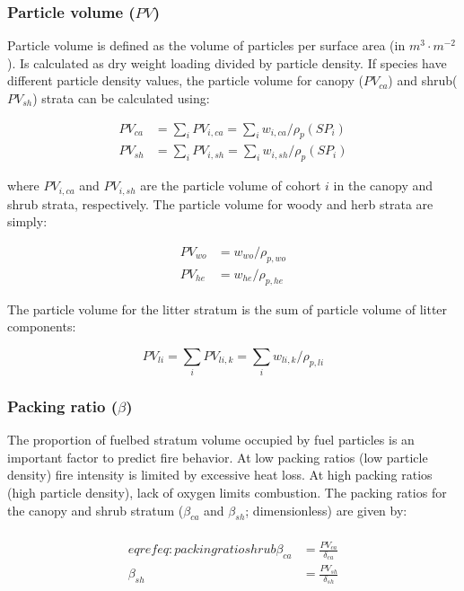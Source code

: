 \documentclass[]{book}
\begin{document}
\subsubsection{\texorpdfstring{Particle volume
(\(PV\))}{Particle volume (PV)}}\label{particle-volume-pv}

Particle volume is defined as the volume of particles per surface area
(in \(m^3\cdot m^{-2}\)). Is calculated as dry weight loading divided by
particle density. If species have different particle density values, the
particle volume for canopy (\(PV_{ca}\)) and shrub(\(PV_{sh}\)) strata
can be calculated using:

\begin{eqnarray}
PV_{ca} &= \sum_{i}{PV_{i,ca}} = \sum_{i}{w_{i,ca}/\rho_{p}(SP_i)}\\
PV_{sh} &= \sum_{i}{PV_{i,sh}} = \sum_{i}{w_{i,sh}/\rho_{p}(SP_i)}
\end{eqnarray}

where \(PV_{i,ca}\) and \(PV_{i,sh}\) are the particle volume of cohort
\(i\) in the canopy and shrub strata, respectively. The particle volume
for woody and herb strata are simply:

\begin{eqnarray}
PV_{wo} &= w_{wo}/\rho_{p,wo}\\
PV_{he} &= w_{he}/\rho_{p,he}
\end{eqnarray}

The particle volume for the litter stratum is the sum of particle volume
of litter components:

\begin{equation}
PV_{li} = \sum_{i}{PV_{li,k}} = \sum_{i}{w_{li,k}/\rho_{p, li}}
\end{equation}

\subsubsection{\texorpdfstring{Packing ratio
(\(\beta\))}{Packing ratio (\textbackslash{}beta)}}\label{packing-ratio-beta}

The proportion of fuelbed stratum volume occupied by fuel particles is
an important factor to predict fire behavior. At low packing ratios (low
particle density) fire intensity is limited by excessive heat loss. At
high packing ratios (high particle density), lack of oxygen limits
combustion. The packing ratios for the canopy and shrub stratum
(\(\beta_{ca}\) and \(\beta_{sh}\); dimensionless) are given by:

\begin{eqnarray}\\eqref{eq:packingratioshrub}
\beta _{ca} &= \frac{PV_{ca}}{\delta_{ca}}\\
\beta _{sh} &= \frac{PV_{sh}}{\delta_{sh}}
\end{eqnarray}
\end{document}
